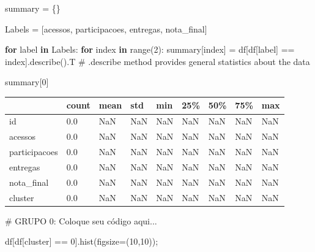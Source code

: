 \documentclass[
  letterpaper,
  DIV=11,
  numbers=noendperiod]{scrartcl}
\newenvironment{Shaded}{\begin{snugshade}}{\end{snugshade}}
\newcommand{\BuiltInTok}[1]{\textcolor[rgb]{0.00,0.23,0.31}{#1}}
\newcommand{\CommentTok}[1]{\textcolor[rgb]{0.37,0.37,0.37}{#1}}
\newcommand{\ControlFlowTok}[1]{\textcolor[rgb]{0.00,0.23,0.31}{\textbf{#1}}}
\newcommand{\DecValTok}[1]{\textcolor[rgb]{0.68,0.00,0.00}{#1}}
\newcommand{\KeywordTok}[1]{\textcolor[rgb]{0.00,0.23,0.31}{\textbf{#1}}}
\newcommand{\NormalTok}[1]{\textcolor[rgb]{0.00,0.23,0.31}{#1}}
\newcommand{\OperatorTok}[1]{\textcolor[rgb]{0.37,0.37,0.37}{#1}}
\newcommand{\StringTok}[1]{\textcolor[rgb]{0.13,0.47,0.30}{#1}}
\begin{document}
\begin{Shaded}
\begin{Highlighting}[]
\NormalTok{summary }\OperatorTok{=}\NormalTok{ \{\}}

\NormalTok{Labels }\OperatorTok{=}\NormalTok{ [}\StringTok{\textquotesingle{}acessos\textquotesingle{}}\NormalTok{, }\StringTok{\textquotesingle{}participacoes\textquotesingle{}}\NormalTok{, }\StringTok{\textquotesingle{}entregas\textquotesingle{}}\NormalTok{, }\StringTok{\textquotesingle{}nota\_final\textquotesingle{}}\NormalTok{]}

\ControlFlowTok{for}\NormalTok{ label }\KeywordTok{in}\NormalTok{ Labels:}
    \ControlFlowTok{for}\NormalTok{ index }\KeywordTok{in} \BuiltInTok{range}\NormalTok{(}\DecValTok{2}\NormalTok{):}
\NormalTok{        summary[index] }\OperatorTok{=}\NormalTok{ df[df[label] }\OperatorTok{==}\NormalTok{ index].describe().T  }\CommentTok{\# .describe method provides general statistics about the data}
\end{Highlighting}
\end{Shaded}

\begin{Shaded}
\begin{Highlighting}[]
\NormalTok{summary[}\DecValTok{0}\NormalTok{]}
\end{Highlighting}
\end{Shaded}

\begin{longtable}[]{@{}lllllllll@{}}
\toprule\noalign{}
& count & mean & std & min & 25\% & 50\% & 75\% & max \\
\midrule\noalign{}
\endhead
\bottomrule\noalign{}
\endlastfoot
id & 0.0 & NaN & NaN & NaN & NaN & NaN & NaN & NaN \\
acessos & 0.0 & NaN & NaN & NaN & NaN & NaN & NaN & NaN \\
participacoes & 0.0 & NaN & NaN & NaN & NaN & NaN & NaN & NaN \\
entregas & 0.0 & NaN & NaN & NaN & NaN & NaN & NaN & NaN \\
nota\_final & 0.0 & NaN & NaN & NaN & NaN & NaN & NaN & NaN \\
cluster & 0.0 & NaN & NaN & NaN & NaN & NaN & NaN & NaN \\
\end{longtable}

\begin{Shaded}
\begin{Highlighting}[]
\CommentTok{\# GRUPO 0: Coloque seu código aqui...}

\NormalTok{df[df[}\StringTok{\textquotesingle{}cluster\textquotesingle{}}\NormalTok{] }\OperatorTok{==} \DecValTok{0}\NormalTok{].hist(figsize}\OperatorTok{=}\NormalTok{(}\DecValTok{10}\NormalTok{,}\DecValTok{10}\NormalTok{))}\OperatorTok{;}
\end{Highlighting}
\end{Shaded}
\end{document}
